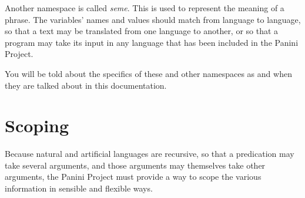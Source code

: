 \documentclass{article}
\begin{document}
Another namespace is called \emph{seme}. This is used to represent the meaning
of a phrase. The variables' names and values should match from language to
language, so that a text may be translated from one language to another, or so
that a program may take its input in any language that has been included in the
Panini Project.

You will be told about the specifics of these and other namespaces as and when
they are talked about in this documentation.

\section{Scoping} 
Because natural and artificial languages are recursive, so that a predication
may take several arguments, and those arguments may themselves take other
arguments, the Panini Project must provide a way to scope the various
information in sensible and flexible ways.




\label{end}
\end{document}
